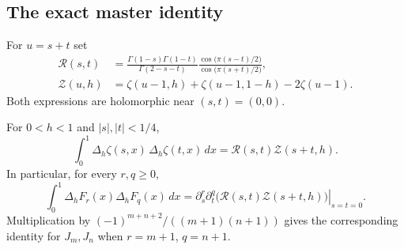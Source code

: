 \subsection{The exact master identity}

For $u=s+t$ set
\begin{align}
 \mathcal R(s,t)&=
 \frac{\Gamma(1-s)\Gamma(1-t)}{\Gamma(2-s-t)}
 \frac{\cos\bigl(\pi(s-t)/2\bigr)}{\cos\bigl(\pi(s+t)/2\bigr)},
 \label{eq:R-kernel}\\
 \mathcal Z(u,h)&=\zeta(u-1,h)+\zeta(u-1,1-h)-2\zeta(u-1).
 \label{eq:Z-kernel}
\end{align}
Both expressions are holomorphic near $(s,t)=(0,0)$.

\begin{theorem}\label{thm:translation}
For $0<h<1$ and $|s|,|t|<1/4$,
\begin{equation}\label{eq:translation-master}
 \boxed{\quad
 \int_0^1\Delta_h\zeta(s,x)\,\Delta_h\zeta(t,x)\,dx
      =\mathcal R(s,t)\mathcal Z(s+t,h).
 \quad}
\end{equation}
In particular, for every $r,q\geq0$,
\begin{equation}\label{eq:translation-jets}
 \int_0^1\Delta_hF_r(x)\Delta_hF_q(x)\,dx
 =\left.\partial_s^r\partial_t^q
        \bigl(\mathcal R(s,t)\mathcal Z(s+t,h)\bigr)\right|_{s=t=0}.
\end{equation}
Multiplication by $(-1)^{m+n+2}/((m+1)(n+1))$ gives the corresponding
identity for $J_m,J_n$ when $r=m+1$, $q=n+1$.
\end{theorem}

